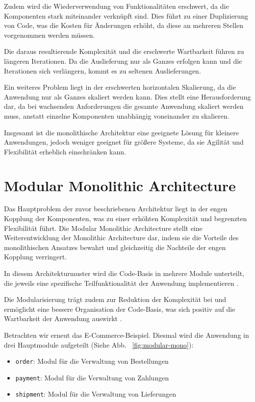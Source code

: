 \documentclass[acmtog]{acmart}
\begin{document}
Zudem wird die Wiederverwendung von Funktionalitäten erschwert, da die Komponenten
stark miteinander verknüpft sind.
Dies führt zu einer Duplizierung von Code, was die Kosten für Änderungen erhöht,
da diese an mehreren Stellen vorgenommen werden müssen.

Die daraus resultierende Komplexität und die erschwerte Wartbarkeit führen zu längeren
Iterationen.
Da die Auslieferung nur als Ganzes erfolgen kann und die Iterationen
sich verlängern, kommt es zu seltenen Auslieferungen.

Ein weiteres Problem liegt in der erschwerten horizontalen Skalierung, da die Anwendung
nur als Ganzes skaliert werden kann.
Dies stellt eine Herausforderung dar, da bei wachsenden
Anforderungen die gesamte Anwendung skaliert werden muss, anstatt einzelne Komponenten unabhängig
voneinander zu skalieren.

Insgesamt ist die monolithische Architektur eine geeignete Lösung für
kleinere Anwendungen, jedoch weniger geeignet für größere Systeme, da sie Agilität und
Flexibilität erheblich einschränken kann.

\section{Modular Monolithic Architecture}
\label{sec:modulith}
Das Hauptproblem der zuvor beschriebenen Architektur liegt in der engen Kopplung der Komponenten,
was zu einer erhöhten Komplexität und begrenzten Flexibilität führt.
Die Modular Monolithic Architecture stellt eine Weiterentwicklung der Monolithic Architecture dar,
indem sie die Vorteile des monolithischen Ansatzes bewahrt und gleichzeitig die Nachteile
der engen Kopplung verringert.

In diesem Architekturmuster wird die Code-Basis in mehrere Module unterteilt, die jeweils
eine spezifische Teilfunktionalität der Anwendung implementieren \cite[11]{modular-mono2}.

Die Modularisierung trägt zudem zur Reduktion der Komplexität bei und ermöglicht eine bessere
Organisation der Code-Basis, was sich positiv auf die Wartbarkeit der Anwendung auswirkt \cite[23 - 24]{modular-mono4}.


Betrachten wir erneut das E-Commerce-Beispiel.
Diesmal wird die Anwendung in drei Hauptmodule aufgeteilt (Siehe Abb. ~\ref{fig:modular-mono}):
\begin{itemize}
  \item \texttt{order}: Modul für die Verwaltung von Bestellungen
  \item \texttt{payment}: Modul für die Verwaltung von Zahlungen
  \item \texttt{shipment}: Modul für die Verwaltung von Lieferungen
\end{itemize}
\end{document}
